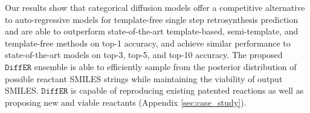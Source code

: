 \documentclass{article}
\newcommand{\ours}{$\texttt{DiffER}$\xspace}
\begin{document}
Our results show that categorical diffusion models offer a competitive alternative to auto-regressive models for template-free single step retrosynthesis prediction and are able to outperform state-of-the-art template-based, semi-template, and template-free methods on top-1 accuracy, and achieve similar performance to state-of-the-art models on top-3, top-5, and top-10 accuracy. The proposed \ours ensemble is able to efficiently sample from the posterior distribution of possible reactant SMILES strings while maintaining the viability of output SMILES. \ours is capable of reproducing existing patented reactions as well as proposing new and viable reactants (Appendix \ref{sec:case_study}).


\end{document}
